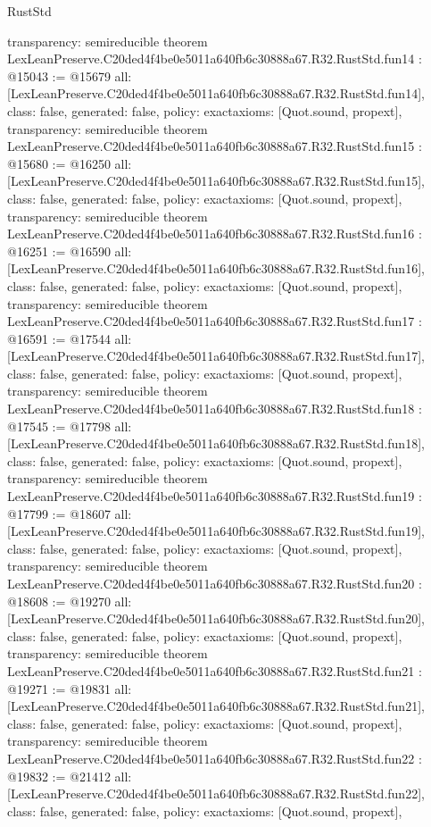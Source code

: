 \begin{lexlean}{RustStd}
\begin{coremodule}
{  transparency: semireducible
}
theorem LexLeanPreserve.C20ded4f4be0e5011a640fb6c30888a67.R32.RustStd.fun14 : @15043 := @15679 {
  all: [LexLeanPreserve.C20ded4f4be0e5011a640fb6c30888a67.R32.RustStd.fun14],
  class: false,
  generated: false,
  policy: exact{axioms: [Quot.sound, propext]},
  transparency: semireducible
}
theorem LexLeanPreserve.C20ded4f4be0e5011a640fb6c30888a67.R32.RustStd.fun15 : @15680 := @16250 {
  all: [LexLeanPreserve.C20ded4f4be0e5011a640fb6c30888a67.R32.RustStd.fun15],
  class: false,
  generated: false,
  policy: exact{axioms: [Quot.sound, propext]},
  transparency: semireducible
}
theorem LexLeanPreserve.C20ded4f4be0e5011a640fb6c30888a67.R32.RustStd.fun16 : @16251 := @16590 {
  all: [LexLeanPreserve.C20ded4f4be0e5011a640fb6c30888a67.R32.RustStd.fun16],
  class: false,
  generated: false,
  policy: exact{axioms: [Quot.sound, propext]},
  transparency: semireducible
}
theorem LexLeanPreserve.C20ded4f4be0e5011a640fb6c30888a67.R32.RustStd.fun17 : @16591 := @17544 {
  all: [LexLeanPreserve.C20ded4f4be0e5011a640fb6c30888a67.R32.RustStd.fun17],
  class: false,
  generated: false,
  policy: exact{axioms: [Quot.sound, propext]},
  transparency: semireducible
}
theorem LexLeanPreserve.C20ded4f4be0e5011a640fb6c30888a67.R32.RustStd.fun18 : @17545 := @17798 {
  all: [LexLeanPreserve.C20ded4f4be0e5011a640fb6c30888a67.R32.RustStd.fun18],
  class: false,
  generated: false,
  policy: exact{axioms: [Quot.sound, propext]},
  transparency: semireducible
}
theorem LexLeanPreserve.C20ded4f4be0e5011a640fb6c30888a67.R32.RustStd.fun19 : @17799 := @18607 {
  all: [LexLeanPreserve.C20ded4f4be0e5011a640fb6c30888a67.R32.RustStd.fun19],
  class: false,
  generated: false,
  policy: exact{axioms: [Quot.sound, propext]},
  transparency: semireducible
}
theorem LexLeanPreserve.C20ded4f4be0e5011a640fb6c30888a67.R32.RustStd.fun20 : @18608 := @19270 {
  all: [LexLeanPreserve.C20ded4f4be0e5011a640fb6c30888a67.R32.RustStd.fun20],
  class: false,
  generated: false,
  policy: exact{axioms: [Quot.sound, propext]},
  transparency: semireducible
}
theorem LexLeanPreserve.C20ded4f4be0e5011a640fb6c30888a67.R32.RustStd.fun21 : @19271 := @19831 {
  all: [LexLeanPreserve.C20ded4f4be0e5011a640fb6c30888a67.R32.RustStd.fun21],
  class: false,
  generated: false,
  policy: exact{axioms: [Quot.sound, propext]},
  transparency: semireducible
}
theorem LexLeanPreserve.C20ded4f4be0e5011a640fb6c30888a67.R32.RustStd.fun22 : @19832 := @21412 {
  all: [LexLeanPreserve.C20ded4f4be0e5011a640fb6c30888a67.R32.RustStd.fun22],
  class: false,
  generated: false,
  policy: exact{axioms: [Quot.sound, propext]},
}
\end{coremodule}
\end{lexlean}
